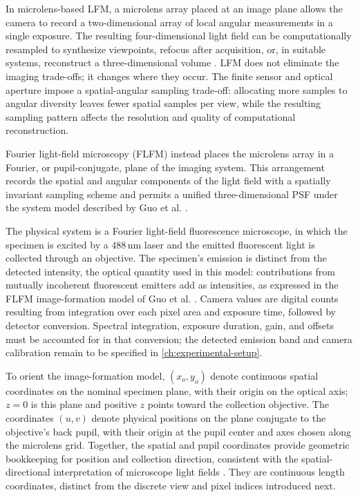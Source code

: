 In microlens-based LFM, a microlens array placed at an image plane allows the camera to record a two-dimensional array of local angular measurements in a single exposure. The resulting four-dimensional light field can be computationally resampled to synthesize viewpoints, refocus after acquisition, or, in suitable systems, reconstruct a three-dimensional volume \cite{levoy2006lightFieldMicroscopy,levoy2009recordingControlling4d,broxton2013waveOpticsLfm}. LFM does not eliminate the imaging trade-offs; it changes where they occur. The finite sensor and optical aperture impose a spatial-angular sampling trade-off: allocating more samples to angular diversity leaves fewer spatial samples per view, while the resulting sampling pattern affects the resolution and quality of computational reconstruction.

Fourier light-field microscopy (FLFM) instead places the microlens array in a Fourier, or pupil-conjugate, plane of the imaging system. This arrangement records the spatial and angular components of the light field with a spatially invariant sampling scheme and permits a unified three-dimensional PSF under the system model described by Guo et al. \cite{guo2019fourierLightField}.

The physical system is a Fourier light-field fluorescence microscope, in which the specimen is excited by a $488\,\mathrm{nm}$ laser and the emitted fluorescent light is collected through an objective.
The specimen's emission is distinct from the detected intensity, the optical quantity used in this model: contributions from mutually incoherent fluorescent emitters add as intensities, as expressed in the FLFM image-formation model of Guo et al. \cite{guo2019fourierLightField}.
Camera values are digital counts resulting from integration over each pixel area and exposure time, followed by detector conversion.
Spectral integration, exposure duration, gain, and offsets must be accounted for in that conversion; the detected emission band and camera calibration remain to be specified in \cref{ch:experimental-setup}.

To orient the image-formation model, $(x_o,y_o)$ denote continuous spatial coordinates on the nominal specimen plane, with their origin on the optical axis; $z=0$ is this plane and positive $z$ points toward the collection objective.
The coordinates $(u,v)$ denote physical positions on the plane conjugate to the objective's back pupil, with their origin at the pupil center and axes chosen along the microlens grid.
Together, the spatial and pupil coordinates provide geometric bookkeeping for position and collection direction, consistent with the spatial-directional interpretation of microscope light fields \cite{levoy2009recordingControlling4d}.
They are continuous length coordinates, distinct from the discrete view and pixel indices introduced next.

